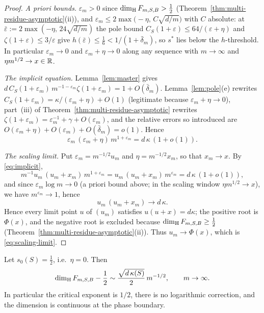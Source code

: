 \begin{proof}
\emph{A priori bounds.}  $\varepsilon_m>0$ since $\dim_{\mathrm{H}} F_{m,S,B}>\tfrac12$
(Theorem~\ref{thm:multi-residue-asymptotic}(ii)), and
$\varepsilon_m\le 2\max\bigl(-\eta,\,C\sqrt{d/m}\bigr)$ with $C$ absolute: at
$\bar\varepsilon:=2\max(-\eta,\,24\sqrt{d/m})$ the pole bound
$C_S(1+\varepsilon)\le64/(\varepsilon+\eta)$ and
$\zeta(1+\varepsilon)\le3/\varepsilon$ give $h(\bar\varepsilon)\le\tfrac16
<1/(1+\bar\delta_m)$, so $s^*$ lies below the $h$-threshold.  In particular
$\varepsilon_m\to0$ and $\varepsilon_m+\eta\to0$ along any sequence with
$m\to\infty$ and $\eta m^{1/2}\to x\in\mathbb{R}$.

\emph{The implicit equation.}  Lemma~\ref{lem:master} gives
$d\,C_S(1+\varepsilon_m)\,m^{-1-\varepsilon_m}\zeta(1+\varepsilon_m)
=1+O(\bar\delta_m)$.  Lemma~\ref{lem:pole}(e) rewrites
$C_S(1+\varepsilon_m)=\kappa/(\varepsilon_m+\eta)+O(1)$ (legitimate because
$\varepsilon_m+\eta\to0$), part~(iii) of
Theorem~\ref{thm:multi-residue-asymptotic} rewrites
$\zeta(1+\varepsilon_m)=\varepsilon_m^{-1}+\gamma+O(\varepsilon_m)$, and the
relative errors so introduced are
$O(\varepsilon_m+\eta)+O(\varepsilon_m)+O(\bar\delta_m)=o(1)$.  Hence
\begin{equation}\label{eq:implicit}
\varepsilon_m\,(\varepsilon_m+\eta)\,m^{1+\varepsilon_m}=d\,\kappa\,(1+o(1)).
\end{equation}

\emph{The scaling limit.}  Put $\varepsilon_m=m^{-1/2}u_m$ and
$\eta=m^{-1/2}x_m$, so that $x_m\to x$.  By \eqref{eq:implicit},
\[
m^{-1}u_m\,(u_m+x_m)\,m^{1+\varepsilon_m}
=u_m\,(u_m+x_m)\,m^{\varepsilon_m}
=d\,\kappa\,(1+o(1)),
\]
and since $\varepsilon_m\log m\to0$ (a priori bound above; in the scaling
window $\eta m^{1/2}\to x$), we have $m^{\varepsilon_m}\to1$, hence
\[
u_m\,(u_m+x_m)\longrightarrow d\,\kappa .
\]
Hence every limit point $u$ of $(u_m)$ satisfies $u(u+x)=d\kappa$; the positive
root is $\Phi(x)$, and the negative root is excluded because
$\dim_{\mathrm{H}} F_{m,S,B}\ge\frac12$ (Theorem~\ref{thm:multi-residue-asymptotic}(ii)).
Thus $u_m\to\Phi(x)$, which is \eqref{eq:scaling-limit}.
\end{proof}

\begin{corollary}\label{cor:critical-exp}
Let $s_0(S)=\frac12$, i.e.\ $\eta=0$. Then
\[
\dim_{\mathrm{H}} F_{m,S,B}-\frac12\sim\frac{\sqrt{d\,\kappa(S)}}{2}\,m^{-1/2},
\qquad m\to\infty .
\]
In particular the critical exponent is $1/2$, there is no logarithmic
correction, and the dimension is continuous at the phase boundary.
\end{corollary}

